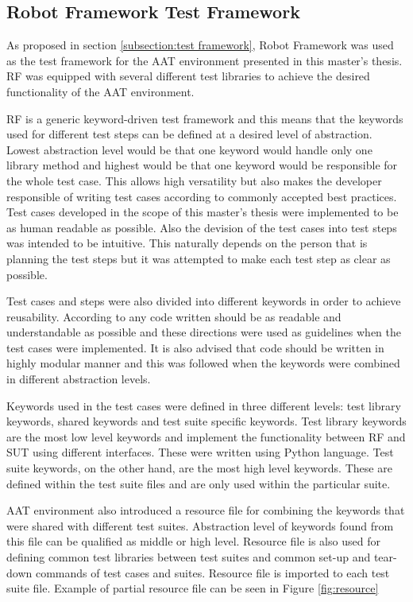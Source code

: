 \subsection{Robot Framework Test Framework}
\label{subsection:Robot Framework and libraries}

As proposed in section \ref{subsection:test framework}, Robot Framework was used as the test framework for the AAT environment presented in this master's thesis. RF was equipped with several different test libraries to achieve the desired functionality of the AAT environment.

RF is a generic keyword-driven test framework and this means that the keywords used for different test steps can be defined at a desired level of abstraction. Lowest abstraction level would be that one keyword would handle only one library method and highest would be that one keyword would be responsible for the whole test case. This allows high versatility but also makes the developer responsible of writing test cases according to commonly accepted best practices. Test cases developed in the scope of this master's thesis were implemented to be as human readable as possible. Also the devision of the test cases into test steps was intended to be intuitive. This naturally depends on the person that is planning the test steps but it was attempted to make each test step as clear as possible.

Test cases and steps were also divided into different keywords in order to achieve reusability. According to \cite{clean-code} any code written should be as readable and understandable as possible and these directions were used as guidelines when the test cases were implemented. It is also advised that code should be written in highly modular manner and this was followed when the keywords were combined in different abstraction levels.

Keywords used in the test cases were defined in three different levels: test library keywords, shared keywords and test suite specific keywords. Test library keywords are the most low level keywords and implement the functionality between RF and SUT using different interfaces. These were written using Python language. Test suite keywords, on the other hand, are the most high level keywords. These are defined within the test suite files and are only used within the particular suite.

AAT environment also introduced a resource file for combining the keywords that were shared with different test suites. Abstraction level of keywords found from this file can be qualified as middle or high level. Resource file is also used for defining common test libraries between test suites and common set-up and tear-down commands of test cases and suites. Resource file is imported to each test suite file. Example of partial resource file can be seen in Figure \ref{fig:resource}

